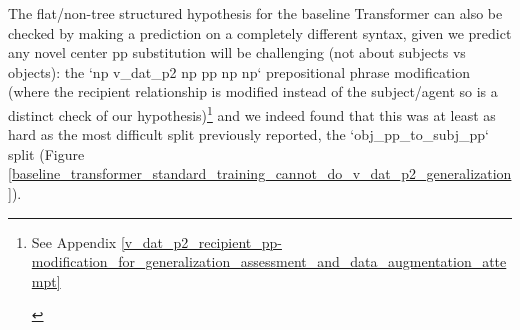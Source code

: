 \documentclass[11pt]{article}
\begin{document}
The flat/non-tree structured hypothesis for the baseline Transformer can also be checked by making a prediction on a completely different syntax, given we predict any novel center pp substitution will be challenging (not about subjects vs objects): the `np v\_dat\_p2 np pp np np` prepositional phrase modification (where the recipient relationship is modified instead of the subject/agent so is a distinct check of our hypothesis)\footnote{\begin{footnotesize}See Appendix \ref{v_dat_p2_recipient_pp-modification_for_generalization_assessment_and_data_augmentation_attempt}\end{footnotesize}} and we indeed found that this was at least as hard as the most difficult split previously reported, the `obj\_pp\_to\_subj\_pp` split (Figure \ref{baseline_transformer_standard_training_cannot_do_v_dat_p2_generalization}).
\end{document}
